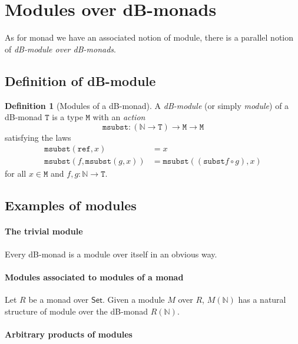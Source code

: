 \documentclass[a4paper,twoside,12pt]{article}
\theoremstyle{definition}
\newtheorem{definition}{Definition}
\theoremstyle{remark}
\newcommand{\NN}{\mathbb{N}}
\newcommand{\subst}{\mathtt{subst}}
\newcommand{\refe}{\mathtt{ref}}
\newcommand{\TT}{\mathtt{T}}
\newcommand{\MM}{\mathtt{M}}
\newcommand{\msubst}{\mathtt{msubst}}
\begin{document}
\section{Modules over dB-monads}
\label{sec:modules}

As for monad we have an associated notion of module, there is a
parallel notion of \emph{dB-module over dB-monads}.

\subsection{Definition of dB-module}
\label{sec:definition-module}

\begin{definition}[Modules of a dB-monad]
  A \emph{dB-module} (or simply \emph{module}) of a dB-monad $\TT$ is
  a type $\MM$ with an \emph{action}
  \begin{equation*}
    \msubst\colon (\NN\to \TT) \to \MM \to \MM
  \end{equation*}
  satisfying the laws
  \begin{align*}
    \msubst(\refe,x) &= x\\
    \msubst(f,\msubst(g,x)) &= \msubst((\subst f \circ g), x)
  \end{align*}
  for all $x\in \MM$ and $f,g\colon \NN \to \TT$.
\end{definition}

\subsection{Examples of modules}
\label{sec:examples-modules}

\paragraph{The trivial module}

Every dB-monad is a module over itself in an obvious way.

\paragraph{Modules associated to modules of a monad}

Let $R$ be a monad over $\mathsf{Set}$.  Given a module $M$ over $R$,
$M(\NN)$ has a natural structure of module over the dB-monad $R(\NN)$.

\paragraph{Arbitrary products of modules}
\end{document}
